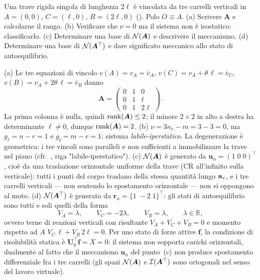 \begin{esercizio}
	\label{ex:C05_tre_carrelli}
	
	Una trave rigida singola di lunghezza $2\ell$ è vincolata da
	tre carrelli verticali in $A=(0,0)$, $C=(\ell,0)$,
	$B=(2\ell,0)$ (). Polo $O\equiv A$.
	(a) Scrivere $\bm{A}$ e calcolarne il rango.
	(b) Verificare che $\nu=0$ ma il sistema non è isostatico:
	classificarlo. (c) Determinare una base di $\mathcal{N}(\bm{A})$ e
	descrivere il meccanismo. (d) Determinare una base di
	$\mathcal{N}(\bm{A}^\top)$ e dare significato meccanico allo stato
	di autoequilibrio.
	
	\risultato (a) Le tre equazioni di vincolo $v(A)=v_A=\bar{v}_A$,
	$v(C)=v_A+\theta\,\ell=\bar{v}_C$,
	$v(B)=v_A+2\theta\,\ell=\bar{v}_B$ danno
	\[
	\bm{A}=
	\begin{pmatrix}
		0 & 1 & 0\\
		0 & 1 & \ell\\
		0 & 1 & 2\ell
	\end{pmatrix}.
	\]
	La prima colonna è nulla, quindi $\operatorname{rank}(\bm{A})\le 2$; il minore
	$2\times 2$ in alto a destra ha determinante $\ell\neq 0$,
	dunque $\operatorname{rank}(\bm{A})=2$.
	(b) $\nu=3n_c-m=3-3=0$, ma $g_\ell=n-r=1$ e
	$g_{\mathscr{i}}=m-r=1$: sistema \emph{labile-iperstatico}.
	La degenerazione è geometrica: i tre vincoli sono paralleli
	e non sufficienti a immobilizzare la trave nel piano
	(cfr.~, riga
	"labile-iperstatico").
	(c) $\mathcal{N}(\bm{A})$ è generato da $\bm{u}_n=(1\;0\;0)^\top$,
	cioè da una traslazione orizzontale uniforme della trave (CR
	all'infinito sulla verticale): tutti i punti del corpo
	traslano della stessa quantità lungo $\mathbf{a}_x$, e i tre carrelli
	verticali — non sentendo lo spostamento orizzontale — non si
	oppongono al moto.
	(d) $\mathcal{N}(\bm{A}^\top)$ è generato da
	$\bm{r}_n=\{1\;-2\;1\}^\top$: gli stati di autoequilibrio sono
	tutti e soli quelli della forma
	\[
	V_A=\lambda,\qquad V_C=-2\lambda,\qquad V_B=\lambda,
	\qquad \lambda\in\mathbb{R},
	\]
	ovvero terne di reazioni verticali con risultante
	$V_A+V_C+V_B=0$ e momento rispetto ad $A$
	$V_C\,\ell+V_B\,2\ell=0$.  Per uno stato di forze attive
	$\bm{f}$, la condizione di risolubilità statica è
	$\bm{U}_q^\top\bm{f}=X=0$: il sistema non sopporta carichi
	orizzontali, dualmente al fatto che il meccanismo $\bm{u}_n$
	del punto~(c) non produce spostamento differenziale fra i tre
	carrelli (gli spazi $\mathcal{N}(\bm{A})$ e $\mathcal{I}(\bm{A}^\top)$ sono
	ortogonali nel senso del lavoro virtuale).
\end{esercizio}


